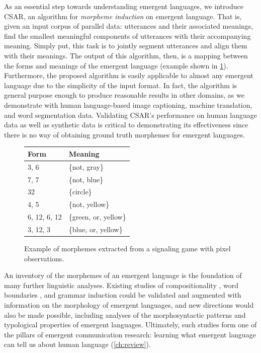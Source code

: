 As an essential step towards understanding emergent languages, we introduce CSAR, an algorithm for \emph{morpheme induction} on emergent language.
That is, given an input corpus of parallel data: utterances and their associated meanings, find the smallest meaningful components of utterances with their accompanying meaning.
Simply put, this task is to jointly segment utterances and align them with their meanings.
The output of this algorithm, then, is a mapping between the forms and meanings of the emergent language (example shown in \cref{fig:example}).
Furthermore, the proposed algorithm is easily applicable to almost any emergent language due to the simplicity of the input format.
In fact, the algorithm is general purpose enough to produce reasonable results in other domains, as we demonstrate with human language-based image captioning, machine translation, and word segmentation data.
Validating CSAR's performance on human language data as well as synthetic data is critical to demonstrating its effectiveness since there is no way of obtaining ground truth morphemes for emergent languages.

\begin{figure}
\centering
\begin{tabular}{ll}
  \toprule
  Form & Meaning \\
  \midrule
  3, 6 & \{not, gray\} \\
  7, 7 & \{not, blue\} \\
  32 & \{circle\} \\
  4, 5 & \{not, yellow\} \\
  6, 12, 6, 12 & \{green, or, yellow\} \\
  3, 12, 3 & \{blue, or, yellow\} \\
  \bottomrule
\end{tabular}

\caption{Example of morphemes extracted from a signaling game with pixel observations.}%
\label{fig:example}
\end{figure}

An inventory of the morphemes of an emergent language is the foundation of many further linguistic analyses.
Existing studies of compositionality \citep{korbak2020measuringnontrivialcompositionalityemergent}, word boundaries \citep{ueda2023on}, and grammar induction \citep{van-der-wal-etal-2020-grammar} could be validated and augmented with information on the morphology of emergent languages,
  and 
  new directions would also be made possible, including analyses of the morphosyntactic patterns and typological properties of emergent languages.
Ultimately, such studies form one of the pillars of emergent communication research: learning what emergent language can tell us about human language (\cref{ch:review}).

